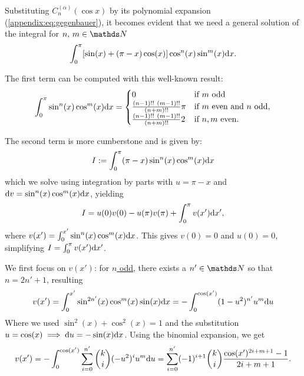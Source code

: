 Substituting $C_n^{(\alpha)}(\cos x)$ by its polynomial expansion (\cref{appendix:eq:gegenbauer}), it becomes evident that we need a general solution of the integral for $n,\,m \in \Naturals$
\begin{equation}
\int_0^\pi \left[ \sin(x) + (\pi - x) \cos(x) \right] \cos^n(x) \sin^m(x) \calcd{x}.
\end{equation}

The first term can be computed with this well-known result:
\begin{equation}
    \int_0^{\pi} \sin^n(x) \cos^m(x) \calcd{x} =
    \begin{cases}
        0                                   & \text{if}\ m\ \text{odd}\\
        \frac{(n-1)!!~(m-1)!!}{(n+m)!!} \pi & \text{if}\ m\ \text{even and }n\ \text{odd},\\
        \frac{(n-1)!!~(m-1)!!}{(n+m)!!} 2   & \text{if}\ n,m\ \text{even}.
    \end{cases}
\end{equation}

The second term is more cumberstone and is given by:
\begin{equation}
    I := \int_0^{\pi} (\pi - x) \sin^n(x) \cos^m(x) \mathrm{d}{x}
\end{equation}
which we solve using integration by parts with $u = \pi - x$ and $\mathrm{d}{v} = \sin^n(x) \cos^m(x) \mathrm{d}{x}$, yielding
\begin{equation}
    I = u(0) v(0) - u(\pi) v(\pi) + \int_0^{\pi} v(x') \mathrm{d}{x'},
\end{equation}
where $v(x') = \int_0^{x'} \sin^n(x) \cos^m(x) \mathrm{d}{x}$. This gives $v(0) = 0$ and $u(0) = 0$, simplifying $I = \int_0^\pi v(x') \mathrm{d}{x'}$.

We first focus on $v(x')$:
for \underline{$n$ odd}, there exists a $n' \in \Naturals$ so that $n = 2n' + 1$, resulting
\begin{equation}
    v(x') = \int_0^{x'} \sin^{2n'}(x) \cos^m(x) \sin(x) \mathrm{d}{x}
          = -\int_0^{\cos(x')} (1 - u^2)^{n'} u^m \mathrm{d}{u}
\end{equation}
Where we used $\sin^2(x) + \cos^2(x) = 1$ and the substitution $u = \cos(x) \implies \mathrm{d}{u} = - \sin(x) \mathrm{d}{x}$. Using the binomial expansion, we get
\begin{equation}
    v(x') = -\int_0^{\cos(x')} \sum_{i=0}^{n'} \binom{k}{i} (-u^2)^i u^m \mathrm{d}{u} 
    = \sum_{i=0}^{n'} (-1)^{i+1} \binom{k}{i} \frac{\cos(x')^{2i+m+1} - 1}{2i+m+1}.
\end{equation}

